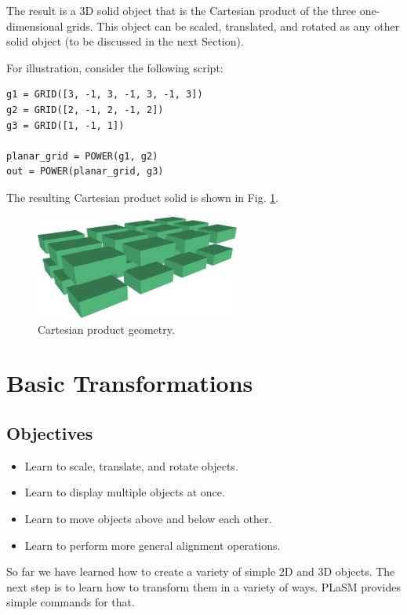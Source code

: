 \noindent
The result is a 3D solid object that is the Cartesian product 
of the three one-dimensional grids. This object can be scaled, 
translated, and rotated as any other solid object (to be discussed
in the next Section).

For illustration, consider the following script:

\begin{bbox}
\begin{verbatim}
g1 = GRID([3, -1, 3, -1, 3, -1, 3])
g2 = GRID([2, -1, 2, -1, 2])
g3 = GRID([1, -1, 1])

planar_grid = POWER(g1, g2)
out = POWER(planar_grid, g3)
\end{verbatim}
\end{bbox}
\vspace{6mm}

\noindent
The resulting Cartesian product solid is shown in Fig. \ref{fig:grid1}.\\

\begin{figure}[!ht]
\begin{center}
\includegraphics[width=0.6\textwidth]{img/grid1.png}
\end{center}
\vspace{-4mm}
\caption{Cartesian product geometry.}
\label{fig:grid1}
\end{figure}
\noindent
 


\section{Basic Transformations}

\subsection{Objectives}
\begin{itemize}
\item Learn to scale, translate, and rotate objects.
\item Learn to display multiple objects at once.
\item Learn to move objects above and below each other.
\item Learn to perform more general alignment operations.
\end{itemize}
So far we have learned how to create a variety of simple 2D and 3D objects. 
The next step is to learn how to transform them in a variety of ways. PLaSM
provides simple commands for that. \\

